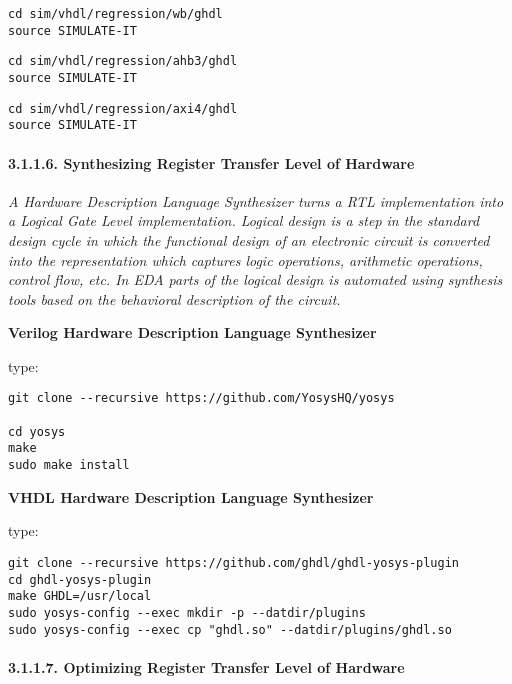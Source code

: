 \documentclass[]{article}
\let\oldparagraph\paragraph
\renewcommand{\paragraph}[1]{\oldparagraph{#1}\mbox{}}
\begin{document}
\begin{verbatim}
cd sim/vhdl/regression/wb/ghdl
source SIMULATE-IT
\end{verbatim}

\begin{verbatim}
cd sim/vhdl/regression/ahb3/ghdl
source SIMULATE-IT
\end{verbatim}

\begin{verbatim}
cd sim/vhdl/regression/axi4/ghdl
source SIMULATE-IT
\end{verbatim}

\paragraph{3.1.1.6. Synthesizing Register Transfer Level of
Hardware}\label{synthesizing-register-transfer-level-of-hardware}

\emph{A Hardware Description Language Synthesizer turns a RTL
implementation into a Logical Gate Level implementation. Logical design
is a step in the standard design cycle in which the functional design of
an electronic circuit is converted into the representation which
captures logic operations, arithmetic operations, control flow, etc. In
EDA parts of the logical design is automated using synthesis tools based
on the behavioral description of the circuit.}

\textbf{Verilog Hardware Description Language Synthesizer}

type:

\begin{verbatim}
git clone --recursive https://github.com/YosysHQ/yosys

cd yosys
make
sudo make install
\end{verbatim}

\textbf{VHDL Hardware Description Language Synthesizer}

type:

\begin{verbatim}
git clone --recursive https://github.com/ghdl/ghdl-yosys-plugin
cd ghdl-yosys-plugin
make GHDL=/usr/local
sudo yosys-config --exec mkdir -p --datdir/plugins
sudo yosys-config --exec cp "ghdl.so" --datdir/plugins/ghdl.so
\end{verbatim}

\paragraph{3.1.1.7. Optimizing Register Transfer Level of
Hardware}\label{optimizing-register-transfer-level-of-hardware}
\end{document}
